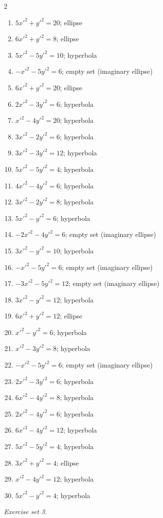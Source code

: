 \begin{multicols}{2}\raggedright
\begin{enumerate}[label=\arabic*., leftmargin=*, itemsep=1pt]
\item $5x'^2+y'^2=20$; ellipse
\item $6x'^2+y'^2=8$; ellipse
\item $5x'^2-5y'^2=10$; hyperbola
\item $-x'^2-5y'^2=6$; empty set (imaginary ellipse)
\item $6x'^2+y'^2=20$; ellipse
\item $2x'^2-3y'^2=6$; hyperbola
\item $x'^2-4y'^2=20$; hyperbola
\item $3x'^2-2y'^2=6$; hyperbola
\item $3x'^2-3y'^2=12$; hyperbola
\item $5x'^2-5y'^2=4$; hyperbola
\item $4x'^2-4y'^2=6$; hyperbola
\item $3x'^2-2y'^2=8$; hyperbola
\item $5x'^2-y'^2=6$; hyperbola
\item $-2x'^2-4y'^2=6$; empty set (imaginary ellipse)
\item $3x'^2-y'^2=10$; hyperbola
\item $-x'^2-5y'^2=6$; empty set (imaginary ellipse)
\item $-3x'^2-5y'^2=12$; empty set (imaginary ellipse)
\item $3x'^2-y'^2=12$; hyperbola
\item $6x'^2+y'^2=12$; ellipse
\item $x'^2-y'^2=6$; hyperbola
\item $x'^2-3y'^2=8$; hyperbola
\item $-x'^2-5y'^2=6$; empty set (imaginary ellipse)
\item $2x'^2-3y'^2=6$; hyperbola
\item $6x'^2-4y'^2=8$; hyperbola
\item $2x'^2-4y'^2=6$; hyperbola
\item $6x'^2-4y'^2=12$; hyperbola
\item $5x'^2-5y'^2=4$; hyperbola
\item $3x'^2+y'^2=4$; ellipse
\item $x'^2-4y'^2=12$; hyperbola
\item $5x'^2-y'^2=4$; hyperbola
\end{enumerate}
\end{multicols}
\par\noindent\emph{Exercise set 3.}\nopagebreak
